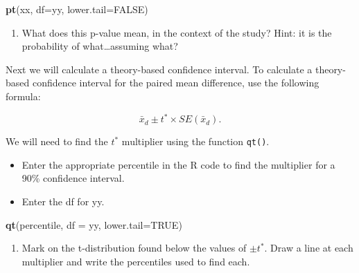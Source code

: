 \documentclass[
]{report}
\newenvironment{Shaded}{\begin{snugshade}}{\end{snugshade}}
\newcommand{\AttributeTok}[1]{\textcolor[rgb]{0.13,0.29,0.53}{#1}}
\newcommand{\ConstantTok}[1]{\textcolor[rgb]{0.56,0.35,0.01}{#1}}
\newcommand{\FunctionTok}[1]{\textcolor[rgb]{0.13,0.29,0.53}{\textbf{#1}}}
\newcommand{\NormalTok}[1]{#1}
\providecommand{\tightlist}{%
  \setlength{\itemsep}{0pt}\setlength{\parskip}{0pt}}
\begin{document}
\begin{Shaded}
\begin{Highlighting}[]
\FunctionTok{pt}\NormalTok{(xx, }\AttributeTok{df=}\NormalTok{yy, }\AttributeTok{lower.tail=}\ConstantTok{FALSE}\NormalTok{)}
\end{Highlighting}
\end{Shaded}

\begin{enumerate}
\def\labelenumi{\arabic{enumi}.}
\setcounter{enumi}{8}
\tightlist
\item
  What does this p-value mean, in the context of the study? Hint: it is the probability of what\ldots assuming what?
  \vspace{1in}
\end{enumerate}

Next we will calculate a theory-based confidence interval. To calculate a theory-based confidence interval for the paired mean difference, use the following formula:

\[\bar{x}_d\pm t^* \times SE(\bar{x}_d).\]

We will need to find the \(t^*\) multiplier using the function \texttt{qt()}.

\begin{itemize}
\item
  Enter the appropriate percentile in the R code to find the multiplier for a 90\% confidence interval.
\item
  Enter the df for yy.
\end{itemize}

\begin{Shaded}
\begin{Highlighting}[]
\FunctionTok{qt}\NormalTok{(percentile, }\AttributeTok{df =}\NormalTok{ yy, }\AttributeTok{lower.tail=}\ConstantTok{TRUE}\NormalTok{)}
\end{Highlighting}
\end{Shaded}

\begin{enumerate}
\def\labelenumi{\arabic{enumi}.}
\setcounter{enumi}{10}
\tightlist
\item
  Mark on the t-distribution found below the values of \(\pm t^*\). Draw a line at each multiplier and write the percentiles used to find each.
  \vspace{1mm}
\end{enumerate}
\end{document}
